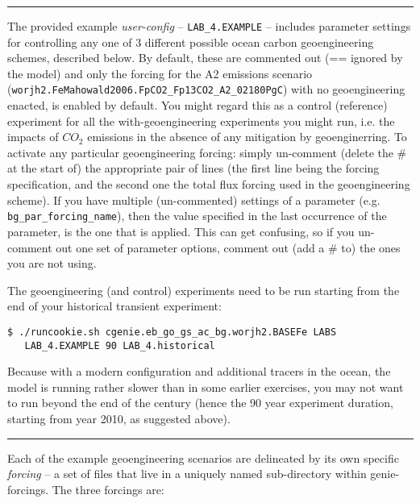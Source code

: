 \vspace{1mm}
\noindent\rule{4cm}{0.1mm}
\vspace{2mm}

\noindent The provided example \textit{user-config} -- \texttt{LAB\_4.EXAMPLE} -- includes parameter settings for controlling any one of 3 different possible ocean carbon geoengineering schemes, described below. By default, these are commented out (== ignored by the model) and only the forcing for the A2 emissions scenario (\texttt{worjh2.FeMahowald2006.FpCO2\_Fp13CO2\_A2\_02180PgC}) with no geoengineering enacted,  is enabled by default. You might regard this as a control (reference) experiment for all the with-geoengineering experiments you might run, i.e. the impacts of \(CO_{2}\) emissions in the absence of any mitigation by geoenginerring. To activate any particular geoengineering forcing: simply un-comment (delete the \# at the start of) the appropriate pair of lines (the first line being the forcing specification, and the second one the total flux forcing used in the geoengineering scheme). If you have multiple (un-commented) settings of a parameter (e.g. \texttt{bg\_par\_forcing\_name}), then the value specified in the last occurrence of the parameter, is the one that is applied. This can get confusing, so if you un-comment out one set of parameter options, comment out (add a \# to) the ones you are not using.

The geoengineering (and control) experiments need to be run starting from the end of your historical transient experiment:
\vspace{-2pt}\begin{verbatim}
$ ./runcookie.sh cgenie.eb_go_gs_ac_bg.worjh2.BASEFe LABS
   LAB_4.EXAMPLE 90 LAB_4.historical
\end{verbatim}\vspace{-2pt}
Because with a modern configuration and additional tracers in the ocean, the model is running rather slower than in some earlier exercises, you may not want to run beyond the end of the century (hence the 90 year experiment duration, starting from year 2010, as suggested above).

\vspace{1mm}
\noindent\rule{4cm}{0.1mm}
\vspace{2mm}

\noindent Each of the example geoengineering scenarios are delineated by its own specific \textit{forcing} – a set of files that live in a uniquely named sub-directory within \textsf{\footnotesize genie-forcings}. The three forcings are:

